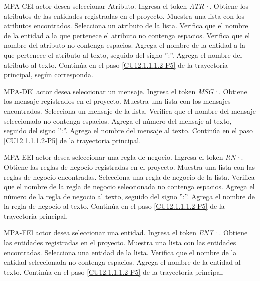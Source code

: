 	\begin{UCtrayectoriaA}{MPA-C}{El actor desea seleccionar Atributo.}
		\UCpaso[\UCactor] Ingresa el token {\em ATR·}. 
		\UCpaso[\UCsist] Obtiene los atributos de las entidades registradas en el proyecto.
		\UCpaso[\UCsist] Muestra una lista con los atributos encontrados.
		\UCpaso[\UCactor] Selecciona un atributo de la lista.
		\UCpaso[\UCsist] Verifica que el nombre de la entidad a la que pertenece el atributo no contenga espacios. 
		\UCpaso[\UCsist] Verifica que el nombre del atributo no contenga espacios. 
		\UCpaso[\UCsist] Agrega el nombre de la entidad a la que pertenece el atributo al texto, seguido del signo '':''.
		\UCpaso[\UCsist] Agrega el nombre del atributo al texto.
		\UCpaso Continúa en el paso \ref{CU12.1.1.1.2-P5} de la trayectoria principal, según corresponda.
	\end{UCtrayectoriaA}

	\begin{UCtrayectoriaA}{MPA-D}{El actor desea seleccionar un mensaje.}
		\UCpaso[\UCactor] Ingresa el token {\em MSG·}. 
		\UCpaso[\UCsist] Obtiene los mensaje registrados en el proyecto.
		\UCpaso[\UCsist] Muestra una lista con los mensajes encontrados.
		\UCpaso[\UCactor] Selecciona un mensaje de la lista.
		\UCpaso[\UCsist] Verifica que el nombre del mensaje seleccionado no contenga espacios. 
		\UCpaso[\UCsist] Agrega el número del mensaje al texto, seguido del signo '':''.
		\UCpaso[\UCsist] Agrega el nombre del mensaje al texto.
		\UCpaso Continúa en el paso \ref{CU12.1.1.1.2-P5} de la trayectoria principal.
	\end{UCtrayectoriaA}

	\begin{UCtrayectoriaA}{MPA-E}{El actor desea seleccionar una regla de negocio.}
		\UCpaso[\UCactor] Ingresa el token {\em RN·}. 
		\UCpaso[\UCsist] Obtiene las reglas de negocio registradas en el proyecto.
		\UCpaso[\UCsist] Muestra una lista con las reglas de negocio encontradas.
		\UCpaso[\UCactor] Selecciona una regla de negocio de la lista.
		\UCpaso[\UCsist] Verifica que el nombre de la regla de negocio seleccionada no contenga espacios. 
		\UCpaso[\UCsist] Agrega el número de la regla de negocio al texto, seguido del signo '':''.
		\UCpaso[\UCsist] Agrega el nombre de la regla de negocio al texto.
		\UCpaso Continúa en el paso \ref{CU12.1.1.1.2-P5} de la trayectoria principal.
	\end{UCtrayectoriaA}

	\begin{UCtrayectoriaA}{MPA-F}{El actor desea seleccionar una entidad.}
		\UCpaso[\UCactor] Ingresa el token {\em ENT·}. 
		\UCpaso[\UCsist] Obtiene las entidades registradas en el proyecto.
		\UCpaso[\UCsist] Muestra una lista con las entidades encontradas.
		\UCpaso[\UCactor] Selecciona una entidad de la lista.
		\UCpaso[\UCsist] Verifica que el nombre de la entidad seleccionada no contenga espacios. 
		\UCpaso[\UCsist] Agrega el nombre de la entidad al texto.
		\UCpaso Continúa en el paso \ref{CU12.1.1.1.2-P5} de la trayectoria principal.
	\end{UCtrayectoriaA}

